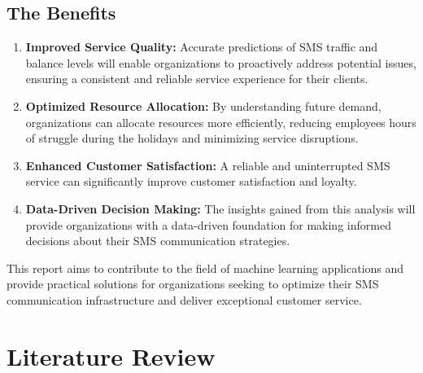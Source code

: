 \documentclass[12pt]{report} %
\begin{document}
\subsection*{The Benefits}
\renewcommand{\labelenumi}{\alph{enumi}}
\begin{enumerate}
		\item \textbf{Improved Service Quality:} Accurate predictions of SMS traffic and balance levels will enable organizations to proactively address potential issues, ensuring a consistent and reliable service experience for their clients.
        \item \textbf{Optimized Resource Allocation:}  By understanding future demand, organizations can allocate resources more efficiently, reducing employees hours of struggle during the holidays and minimizing service disruptions.
        \item \textbf{Enhanced Customer Satisfaction:} A reliable and uninterrupted SMS service can significantly improve customer satisfaction and loyalty.
        \item \textbf{Data-Driven Decision Making:} The insights gained from this analysis will provide organizations with a data-driven foundation for making informed decisions about their SMS communication strategies.
\end{enumerate}

This report aims to contribute to the field of machine learning applications and provide practical solutions for organizations seeking to optimize their SMS communication infrastructure and deliver exceptional customer service.





\clearpage



\section*{Literature Review}
\thispagestyle{empty}    %
\end{document}
